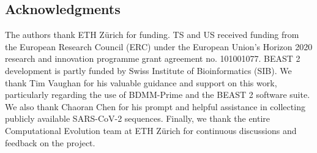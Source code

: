 \subsection*{Acknowledgments}

The authors thank ETH Zürich for funding. TS and US received funding from the European Research Council (ERC) under the European Union’s Horizon 2020 research and innovation programme grant agreement no. 101001077.
BEAST 2 development is partly funded by Swiss Institute of Bioinformatics (SIB).
We thank Tim Vaughan for his valuable guidance and support on this work, particularly regarding the use of BDMM-Prime and the BEAST 2 software suite.
We also thank Chaoran Chen for his prompt and helpful assistance in collecting publicly available SARS-CoV-2 sequences.
Finally, we thank the entire Computational Evolution team at ETH Zürich for continuous discussions and feedback on the project.
